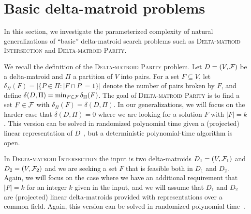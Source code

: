 \section{Basic delta-matroid problems}
\label{sec:part1}
In this section, we investigate the parameterized complexity of
natural generalizations of ``basic'' delta-matroid search problems
such as \textsc{Delta-matroid Intersection} and
\textsc{Delta-matroid Parity}.

We recall the definition of the \textsc{Delta-matroid Parity} problem. 
Let $D=(V,\mathcal F)$ be a delta-matroid and $\Pi$ a partition of $V$ into pairs. 
For a set $F \subseteq V$, let $\delta_{\Pi}(F) = |\{ P \in \Pi : |F \cap P| = 1 \}|$
denote the number of pairs broken by $F$, and define
$\delta(D, \Pi) = \min_{F \in \mathcal F} \delta_{\Pi}(F)$.
The goal of \textsc{Delta-matroid Parity} is to find a set $F \in \mathcal F$ with
$\delta_\Pi(F)=\delta(D,\Pi)$. 
In our generalizations, we will focus on the harder case that $\delta(D,\Pi)=0$
where we are looking for a solution $F$ with $|F|=k$. This version can
be solved in randomized polynomial time given a (projected) linear
representation of $D$~\cite{KW24}, but a deterministic polynomial-time
algorithm is open.

In \textsc{Delta-matroid Intersection} the input is two delta-matroids
$D_1=(V,\mathcal F_1)$ and $D_2=(V,\mathcal F_2)$ and we are seeking a set $F$ that is
feasible both in $D_1$ and $D_2$. Again, we will focus on the case
where we have an additional requirement that $|F|=k$ for an integer
$k$ given in the input, and we will assume that $D_1$ and $D_2$ are
(projected) linear delta-matroids provided with representations over a
common field. Again, this version can be solved in randomized
polynomial time~\cite{KW24}.

